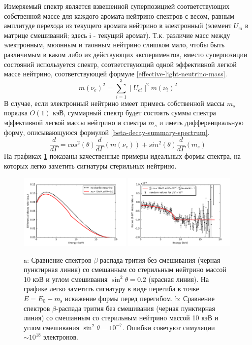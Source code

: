 \documentclass[a4paper,14pt]{extreport}
\begin{document}
Измеряемый спектр является взвешенной суперпозицией соответствующих собственной массе для каждого аромата нейтрино спектров с весом, равным амплитуде перехода из текущего аромата нейтрино в электронный (элемент $ U_{e i} $ в матрице смешиваний; здесь i - текущий аромат). Т.к. различие масс между электронным, мюонным и таонным нейтрино слишком мало, чтобы быть различимым в каком либо из действующих экспериментов, вместо суперпозиции состояний используется спектр, соответствующий одной эффективной легкой массе нейтрино, соответствующей формуле \ref{effective-light-neutrino-mass}.
\begin{equation}\label{effective-light-neutrino-mass}
   m(\nu_{e})^2 = \sum_{i=1}^{3} \mid U_{e i} \mid^2m(\nu_{i})^2  
\end{equation}
В случае, если электронный нейтрино имеет примесь собственной массы $ m_s $ порядка $O(1)$ кэВ, суммарный спектр будет состоять суммы спектра эффективной легкой массы нейтрино и спектра $ m_s $ и иметь дифференциальную форму, описывающуюся формулой \ref{beta-decay-summary-spectrum}.
\begin{equation}\label{beta-decay-summary-spectrum}
    \frac{d}{d\Gamma} = cos^2(\theta) \frac{d}{d\Gamma} (m(\nu_e)) + sin^2(\theta) \frac{d}{d\Gamma} (m_s)
\end{equation}
На графиках \ref{fig:beta-decay-kink} показаны качественные примеры идеальных формы спектра, на которых легко заметить сигнатуры стерильных нейтрино.
\begin{figure}
  \centering
  \includegraphics[width = 0.49\textwidth]{img/beta_decay/PlotKink.pdf}
  \includegraphics[width = 0.49\textwidth]{img/beta_decay/PlotRatio.pdf}
  \caption{a: Сравнение спектров $\beta$-распада трития без смешивания (черная пунктирная линия) со смешанным со стерильным нейтрино массой 10 кэВ и углом смешивания $\sin^{2}\theta=0.2$ (красная линия). На графике легко заметить сигнатуру в виде перегиба в точке $E = E_0 - m_{\mathrm{s}}$ искажение формы перед перегибом. b: Сравнение спектров $\beta$-распада трития без смешивания (черная пунктирная линия) со смешанным со стерильным нейтрино массой 10 кэВ и углом смешивания  $\sin^{2}\theta=10^{-7}$. Ошибки советуют симуляции $\sim 10^{18}$ электронов.}
 \label{fig:beta-decay-kink}
\end{figure}
\end{document}
